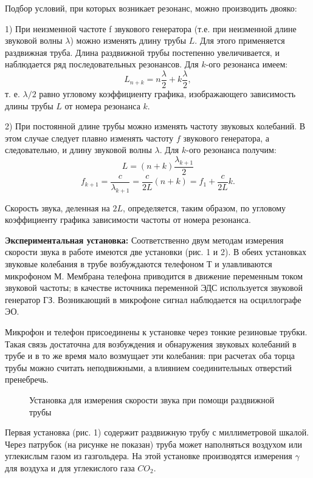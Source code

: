 \documentclass[a4paper,11pt]{extarticle} %
\begin{document}
Подбор условий, при которых возникает резонанс, можно производить двояко:
		
		1) При неизменной частоте f звукового генератора (т.е. при неизменной длине звуковой волны $\lambda$) можно изменять длину трубы $L$. Для этого применяется раздвижная труба. Длина раздвижной трубы постепенно увеличивается, и наблюдается ряд последовательных резонансов. Для $k$-ого резонанса имеем:
		$$L_{n+k}=n\frac{\lambda}{2} + k\frac{\lambda}{2},$$
		т. е. $\lambda/2$ равно угловому коэффициенту графика, изображающего зависимость длины трубы $L$ от номера резонанса $k$.
		
		2) При постоянной длине трубы можно изменять частоту звуковых
		колебаний. В этом случае следует плавно изменять частоту $f$ звукового генератора, а следовательно, и длину звуковой волны $\lambda$.
		Для $k$-ого резонанса получим:
		$$L = (n+k)\frac{\lambda_{k+1}}{2}$$
		$$f_{k+1} = \frac{c}{\lambda_{k+1}}=\frac{c}{2L}(n+k)=f_1 + \frac{c}{2L}k.$$
		
		Скорость звука, деленная на $2L$, определяется, таким образом,
		по угловому коэффициенту графика зависимости частоты от номера
		резонанса.

 
 \textbf{Экспериментальная установка:}
	Соответственно двум методам измерения скорости звука в работе имеются две установки (рис. 1 и 2). В обеих установках звуковые колебания в трубе возбуждаются телефоном Т и улавливаются микрофоном М. Мембрана телефона приводится в движение переменным током звуковой частоты; в качестве источника переменной ЭДС используется звуковой генератор ГЗ. Возникающий в микрофоне сигнал наблюдается на осциллографе ЭО.

	Микрофон и телефон присоединены к установке через тонкие резиновые трубки. Такая связь достаточна для возбуждения и обнаружения звуковых колебаний в трубе и в то же время мало возмущает эти колебания: при расчетах оба торца трубы можно считать неподвижными, а влиянием соединительных отверстий пренебречь.
	
	\begin{figure}[h]
    \caption{Установка для измерения скорости звука при помощи раздвижной трубы}
	\end{figure}
	Первая установка (рис. 1) содержит раздвижную трубу с миллиметровой шкалой. Через патрубок (на рисунке не показан) труба может наполняться воздухом или углекислым газом из газгольдера. На этой установке производятся измерения $\gamma$ для воздуха и для углекислого газа $CO_2$.
	
\end{document}
